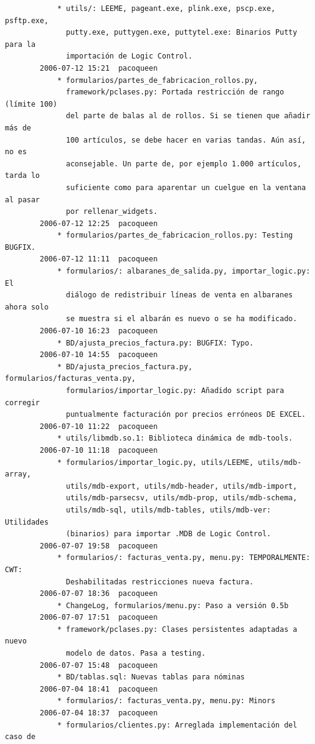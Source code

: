 \documentclass[a4paper]{article}
\begin{document}
\begin{verbatim}
            * utils/: LEEME, pageant.exe, plink.exe, pscp.exe, psftp.exe,
              putty.exe, puttygen.exe, puttytel.exe: Binarios Putty para la
              importación de Logic Control.
        2006-07-12 15:21  pacoqueen
            * formularios/partes_de_fabricacion_rollos.py,
              framework/pclases.py: Portada restricción de rango (límite 100)
              del parte de balas al de rollos. Si se tienen que añadir más de
              100 artículos, se debe hacer en varias tandas. Aún así, no es
              aconsejable. Un parte de, por ejemplo 1.000 artículos, tarda lo
              suficiente como para aparentar un cuelgue en la ventana al pasar
              por rellenar_widgets.
        2006-07-12 12:25  pacoqueen
            * formularios/partes_de_fabricacion_rollos.py: Testing BUGFIX.
        2006-07-12 11:11  pacoqueen
            * formularios/: albaranes_de_salida.py, importar_logic.py: El
              diálogo de redistribuir líneas de venta en albaranes ahora solo
              se muestra si el albarán es nuevo o se ha modificado.
        2006-07-10 16:23  pacoqueen
            * BD/ajusta_precios_factura.py: BUGFIX: Typo.
        2006-07-10 14:55  pacoqueen
            * BD/ajusta_precios_factura.py, formularios/facturas_venta.py,
              formularios/importar_logic.py: Añadido script para corregir
              puntualmente facturación por precios erróneos DE EXCEL.
        2006-07-10 11:22  pacoqueen
            * utils/libmdb.so.1: Biblioteca dinámica de mdb-tools.
        2006-07-10 11:18  pacoqueen
            * formularios/importar_logic.py, utils/LEEME, utils/mdb-array,
              utils/mdb-export, utils/mdb-header, utils/mdb-import,
              utils/mdb-parsecsv, utils/mdb-prop, utils/mdb-schema,
              utils/mdb-sql, utils/mdb-tables, utils/mdb-ver: Utilidades
              (binarios) para importar .MDB de Logic Control.
        2006-07-07 19:58  pacoqueen
            * formularios/: facturas_venta.py, menu.py: TEMPORALMENTE: CWT:
              Deshabilitadas restricciones nueva factura.
        2006-07-07 18:36  pacoqueen
            * ChangeLog, formularios/menu.py: Paso a versión 0.5b
        2006-07-07 17:51  pacoqueen
            * framework/pclases.py: Clases persistentes adaptadas a nuevo
              modelo de datos. Pasa a testing.
        2006-07-07 15:48  pacoqueen
            * BD/tablas.sql: Nuevas tablas para nóminas
        2006-07-04 18:41  pacoqueen
            * formularios/: facturas_venta.py, menu.py: Minors
        2006-07-04 18:37  pacoqueen
            * formularios/clientes.py: Arreglada implementación del caso de

\end{verbatim}
\end{document}
